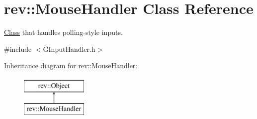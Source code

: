 \hypertarget{classrev_1_1_mouse_handler}{}\section{rev\+::Mouse\+Handler Class Reference}
\label{classrev_1_1_mouse_handler}


\mbox{\hyperlink{struct_class}{Class}} that handles polling-\/style inputs.  




{\ttfamily \#include $<$G\+Input\+Handler.\+h$>$}

Inheritance diagram for rev\+::Mouse\+Handler\+:\begin{figure}[H]
\begin{center}
\leavevmode
\includegraphics[height=2.000000cm]{classrev_1_1_mouse_handler}
\end{center}
\end{figure}
